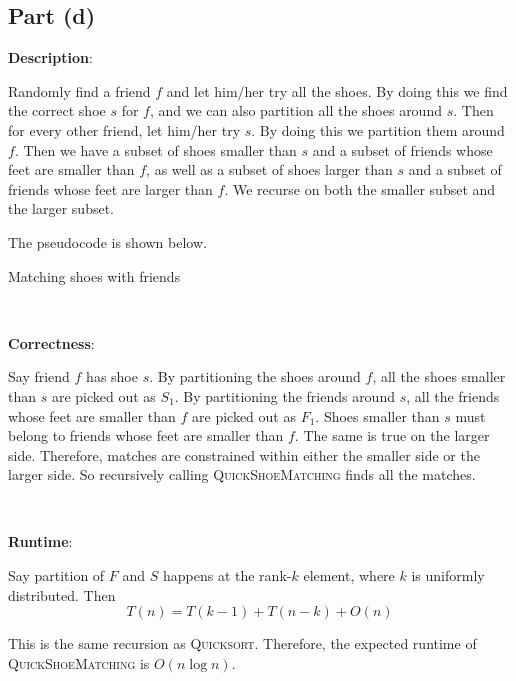 \documentclass{article}
\begin{document}
\subsection{Part (d)}
\noindent\textbf{Description}:

Randomly find a friend $f$ and let him/her try all the shoes. By doing this we find the correct shoe $s$ for $f$, and we can also partition all the shoes around $s$. Then for every other friend, let him/her try $s$. By doing this we partition them around $f$. Then we have a subset of shoes smaller than $s$ and a subset of friends whose feet are smaller than $f$, as well as a subset of shoes larger than $s$ and a subset of friends whose feet are larger than $f$. We recurse on both the smaller subset and the larger subset.

The pseudocode is shown below.
\begin{algorithm}
\caption{Matching shoes with friends}
\begin{algorithmic}[1]
\Else{}
\EndIf
\EndProcedure
\end{algorithmic}
\end{algorithm}

~

\noindent\textbf{Correctness}:

Say friend $f$ has shoe $s$. By partitioning the shoes around $f$, all the shoes smaller than $s$ are picked out as $S_1$. By partitioning the friends around $s$, all the friends whose feet are smaller than $f$ are picked out as $F_1$. Shoes smaller than $s$ must belong to friends whose feet are smaller than $f$. The same is true on the larger side. Therefore, matches are constrained within either the smaller side or the larger side. So recursively calling \textsc{QuickShoeMatching} finds all the matches.

~

\noindent\textbf{Runtime}:

Say partition of $F$ and $S$ happens at the rank-$k$ element, where $k$ is uniformly distributed. Then
\begin{equation*}
T(n)=T(k-1)+T(n-k)+O(n)
\end{equation*}

This is the same recursion as \textsc{Quicksort}. Therefore, the expected runtime of \textsc{QuickShoeMatching} is $O(n\log n)$.
\end{document}
